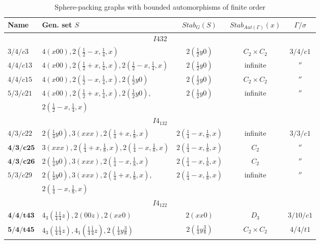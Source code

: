 \documentclass[11pt,a4paper]{article}
\newcommand{\bolit}{\boldsymbol}
\begin{document}
{\tiny
\begin{table}[H]
\begin{center}
\caption{Sphere-packing graphs with bounded automorphisms of finite order}
\label{t:table4}
\begin{tabular}{|l|l|c|c|c|}
\hline
Name & Gen. set $S$ & $Stab_G(S)$ & $Stab_{Aut(\Gamma)}(x)$ & $\Gamma/\sigma$ \\
\hline
\multicolumn{5}{|c|}{$I432$} \\
\hline
\rule{0pt}{2.5ex} $3/4/c3$  & $4(x00), 2(\frac{1}{2}-x, \frac{1}{4}, x)$ & $2(\frac{1}{2}y0)$ & $C_2 \times C_2$ & $3/4/c1$ \\
\rule{0pt}{2.5ex} $4/4/c13$ & $4(x00), 2(\frac{1}{2}+x, \frac{1}{4}, x), 2(\frac{1}{2}-x, \frac{1}{4}, x)$ & $2(\frac{1}{2}y0)$ & infinite & $''$ \\
\rule{0pt}{2.5ex} $4/4/c15$ & $4(x00), 2(\frac{1}{2}-x, \frac{1}{4}, x), 2(\frac{1}{2}y0)$ & $2(\frac{1}{2}y0)$ & $C_2 \times C_2$ & $''$ \\
\rule{0pt}{2.5ex} $5/3/c21$ & $4(x00), 2(\frac{1}{2}+x, \frac{1}{4}, x), 2(\frac{1}{2}y0),$ & $2(\frac{1}{2}y0)$ & infinite &  $''$ \\
& $2(\frac{1}{2}-x, \frac{1}{4}, x)$ & & & \\
\hline
\multicolumn{5}{|c|}{$I4_132$} \\
\hline
\rule{0pt}{2.5ex} $4/3/c22$          & $2(\frac{1}{4}y0), 3(xxx), 2(\frac{1}{4}+x, \frac{1}{8}, x)$ & $2(\frac{1}{4}-x, \frac{1}{8}, x)$ & infinite & $3/3/c1$ \\
\rule{0pt}{2.5ex} $\bolit {4/3/c25}$ & $3(xxx), 2(\frac{1}{4}+x, \frac{1}{8}, x), 2(\frac{1}{4}-x, \frac{1}{8}, x)$ & $2(\frac{1}{4}-x, \frac{1}{8}, x)$ & $C_2$ & $''$ \\
\rule{0pt}{2.5ex} $\bolit {4/3/c26}$ & $2(\frac{1}{4}y0), 3(xxx), 2(\frac{1}{4}-x, \frac{1}{8}, x)$ & $2(\frac{1}{4}-x, \frac{1}{8}, x)$ & $C_2$ & $''$ \\
\rule{0pt}{2.5ex} $5/3/c29$          & $2(\frac{1}{4}y0), 3(xxx), 2(\frac{1}{4}+x, \frac{1}{8}, x),$ & $2(\frac{1}{4}-x, \frac{1}{8}, x)$ & infinite & $''$ \\
\rule{0pt}{2.5ex} & $2(\frac{1}{4}-x, \frac{1}{8}, x)$ & & & \\
\hline
\multicolumn{5}{|c|}{$I4_122$} \\
\hline
\rule{0pt}{2.5ex} $\bolit {4/4/t43}$ & $4_3(\frac{1}{4}\frac{1}{4}z), 2(00z), 2(xx0)$ & $2(xx0)$ & $D_3$ & $3/10/c1$ \\
\rule{0pt}{2.5ex} $\bolit {5/4/t45}$ & $4_3(\frac{1}{4}\frac{1}{4}z), 4_1(\frac{1}{4}\frac{\bar1}{4}z), 2(\frac{1}{4}y\frac{3}{8})$ & $2(\frac{1}{4}y\frac{3}{8})$ & $C_2 \times C_2$ & $4/4/t1$ \\

\end{tabular}
\end{center}
\end{table}}
\end{document}

